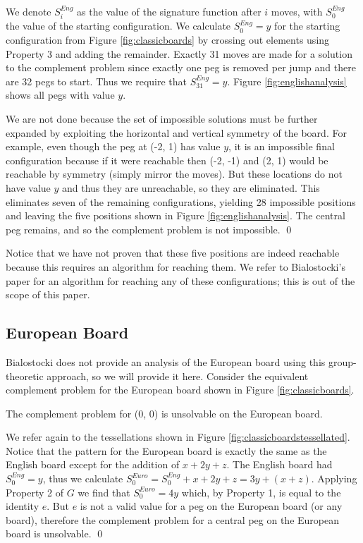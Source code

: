 \documentclass[11pt]{article}
\newenvironment{claim}[1]{\par\noindent{\bfseries Claim.}\space#1}{}
\renewenvironment{proof}{{\noindent\bfseries Proof.}}{\qed}
\begin{document}
\begin{proof}
We denote $S^{Eng}_i$ as the value of the signature function after $i$ moves, with $S^{Eng}_0$ the value of the starting configuration. We calculate $S^{Eng}_0 = y$ for the starting configuration from Figure \ref{fig:classicboards} by crossing out elements using Property 3 and adding the remainder. Exactly 31 moves are made for a solution to the complement problem since exactly one peg is removed per jump and there are 32 pegs to start. Thus we require that $S^{Eng}_{31} = y$. Figure \ref{fig:englishanalysis} shows all pegs with value $y$.

We are not done because the set of impossible solutions must be further expanded by exploiting the horizontal and vertical symmetry of the board. For example, even though the peg at (-2, 1) has value $y$, it is an impossible final configuration because if it were reachable then (-2, -1) and (2, 1) would be reachable by symmetry (simply mirror the moves). But these locations do not have value $y$ and thus they are unreachable, so they are eliminated. This eliminates seven of the remaining configurations, yielding 28 impossible positions and leaving the five positions shown in Figure \ref{fig:englishanalysis}. The central peg remains, and so the complement problem is not impossible.
\end{proof}

Notice that we have not proven that these five positions are indeed reachable because this requires an algorithm for reaching them. We refer to Bialostocki's paper for an algorithm for reaching any of these configurations; this is out of the scope of this paper.

\subsection{European Board}
Bialostocki does not provide an analysis of the European board using this group-theoretic approach, so we will provide it here. Consider the equivalent complement problem for the European board shown in Figure \ref{fig:classicboards}.

\begin{claim}
The complement problem for (0, 0) is unsolvable on the European board.
\end{claim}

\begin{proof}
We refer again to the tessellations shown in Figure \ref{fig:classicboardstessellated}. Notice that the pattern for the European board is exactly the same as the English board except for the addition of $x+ 2y + z$. The English board had $S^{Eng}_0 = y$, thus we calculate $S^{Euro}_0 = S^{Eng}_0 + x + 2y + z = 3y + (x + z)$. Applying Property 2 of $G$ we find that $S^{Euro}_0 = 4y$ which, by Property 1, is equal to the identity $e$. But $e$ is not a valid value for a peg on the European board (or any board), therefore the complement problem for a central peg on the European board is unsolvable.
\end{proof}
\end{document}
